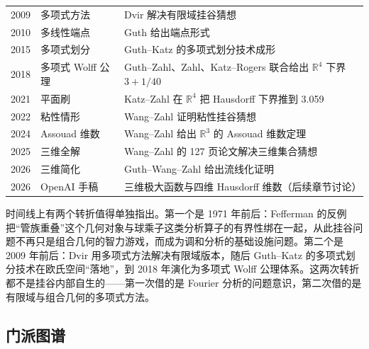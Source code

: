 \begin{table}[t]
\begin{tabularx}{\textwidth}{@{}L{1.5cm}L{4.2cm}Y@{}}
2009 & 多项式方法 & Dvir 解决有限域挂谷猜想 \\
2010 & 多线性端点 & Guth 给出端点形式 \\
2015 & 多项式划分 & Guth--Katz 的多项式划分技术成形 \\
2018 & 多项式 Wolff 公理 & Guth--Zahl、Zahl、Katz--Rogers 联合给出 $\mathbb{R}^4$ 下界 $3+1/40$ \\
2021 & 平面刷 & Katz--Zahl 在 $\mathbb{R}^4$ 把 Hausdorff 下界推到 3.059 \\
2022 & 粘性情形 & Wang--Zahl 证明粘性挂谷猜想 \\
2024 & Assouad 维数 & Wang--Zahl 给出 $\mathbb{R}^3$ 的 Assouad 维数定理 \\
2025 & 三维全解 & Wang--Zahl 的 127 页论文解决三维集合猜想 \\
2026 & 三维简化 & Guth--Wang--Zahl 给出流线化证明 \\
2026 & OpenAI 手稿 & 三维极大函数与四维 Hausdorff 维数（后续章节讨论） \\
\bottomrule
\end{tabularx}
\end{table}

时间线上有两个转折值得单独指出。第一个是 1971 年前后：Fefferman 的反例把“管族重叠”这个几何对象与球乘子这类分析算子的有界性绑在一起，从此挂谷问题不再只是组合几何的智力游戏，而成为调和分析的基础设施问题。第二个是 2009 年前后：Dvir 用多项式方法解决有限域版本，随后 Guth--Katz 的多项式划分技术在欧氏空间“落地”，到 2018 年演化为多项式 Wolff 公理体系。这两次转折都不是挂谷内部自生的——第一次借的是 Fourier 分析的问题意识，第二次借的是有限域与组合几何的多项式方法。

\subsection{门派图谱}

